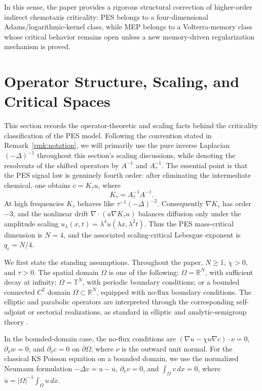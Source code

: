 \documentclass[pdflatex,sn-mathphys-num]{sn-jnl}%
\theoremstyle{thmstyleone}
\theoremstyle{thmstyletwo}
\theoremstyle{thmstylethree}
\begin{document}
In this sense, the paper provides a rigorous structural correction of higher-order indirect chemotaxis criticality: PES belongs to a four-dimensional Adams/logarithmic-kernel class, while MEP belongs to a Volterra-memory class whose critical behavior remains open unless a new memory-driven regularization mechanism is proved.

\section{Operator Structure, Scaling, and Critical Spaces}
\label{sec:operator-scaling-critical-spaces}

This section records the operator-theoretic and scaling facts behind the
criticality classification of the PES model. 
Following the convention stated in Remark~\ref{rmk:notation}, we will primarily use the pure inverse Laplacian $(-\Delta)^{-1}$ throughout this section's scaling discussions, while denoting the resolvents of the shifted operators by $A^{-1}$ and $A_\tau^{-1}$.
The essential point is that the PES signal law is genuinely fourth order: after eliminating the intermediate chemical, one obtains \(c=K_\tau u\), where
\[
        K_\tau = A_\tau^{-1} A^{-1}.
\]
At high frequencies \(K_\tau\) behaves like \(\tau^{-1}(-\Delta)^{-2}\).
Consequently \(\nabla K_\tau\) has order \(-3\), and the nonlinear drift
\(\nabla\!\cdot(u\nabla K_\tau u)\) balances diffusion only under the
amplitude scaling \(u_\lambda(x,t)=\lambda^4u(\lambda x,\lambda^2t)\).
Thus the PES mass-critical dimension is \(N=4\), and the associated
scaling-critical Lebesgue exponent is \(q_c=N/4\).

We first state the standing assumptions.
Throughout the paper, \(N\ge1\), \(\chi>0\), and \(\tau>0\).  The spatial domain \(\Omega\) is one of the following: \(\Omega=\mathbb R^N\), with sufficient decay at infinity; \(\Omega=\mathbb T^N\), with periodic boundary conditions; or a bounded connected \(C^2\) domain \(\Omega\subset\mathbb R^N\), equipped with no-flux boundary conditions.  The elliptic and parabolic operators are interpreted through the corresponding self-adjoint or sectorial realizations, as standard in elliptic and analytic-semigroup theory \cite{gilbarg1998elliptic,evans2022partial,pazy2012semigroups,gao2022rolling,lunardi2012analytic}.

In the bounded-domain case, the no-flux conditions are \((\nabla u-\chi u\nabla c)\cdot\nu=0\), \(\partial_\nu w=0\), and \(\partial_\nu c=0\) on \(\partial\Omega\), where \(\nu\) is the outward unit normal.  For the classical KS Poisson equation on a bounded domain, we use the normalized Neumann formulation \(-\Delta v=u-\overline u\), \(\partial_\nu v=0\), and \(\int_\Omega v\,dx=0\), where \(\overline u=|\Omega|^{-1}\int_\Omega u\,dx\).
\end{document}
